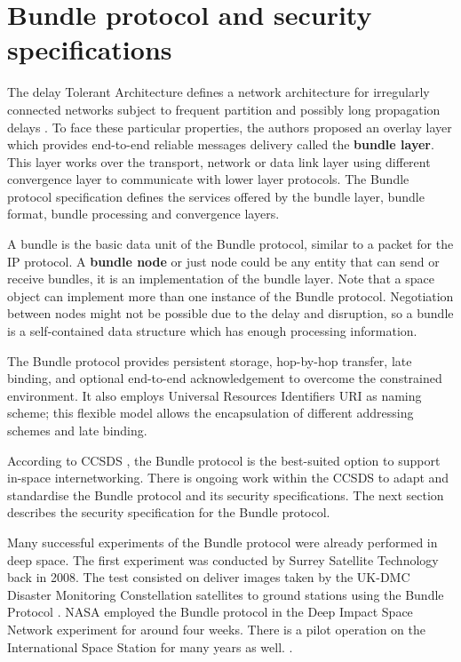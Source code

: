 \section{Bundle protocol and security specifications }
\label{sec:dtn}

The delay Tolerant Architecture defines a network architecture for irregularly connected networks subject to frequent partition and possibly long propagation delays \cite{cerf2007delay}. To face these particular properties, the authors proposed an overlay layer which provides end-to-end reliable messages delivery called the \textbf{bundle layer}. This layer works over the transport, network or data link layer using different convergence layer to communicate with lower layer protocols. The Bundle protocol specification \cite{rfc5050} defines the services offered by the bundle layer, bundle format, bundle processing and convergence layers. 

A bundle is the basic data unit of the Bundle protocol, similar to a packet for the IP protocol. A \textbf{bundle node} or just node could be any entity that can send or receive bundles, it is an implementation of the bundle layer. Note that a space object can implement more than one instance of the Bundle protocol. Negotiation between nodes might not be possible due to the delay and disruption, so a bundle is a self-contained data structure which has enough processing information.


The Bundle protocol provides persistent storage, hop-by-hop transfer, late binding, and optional end-to-end acknowledgement to overcome the constrained environment. It also employs Universal Resources Identifiers URI as naming scheme; this flexible model allows the encapsulation of different addressing schemes and late binding. 

According to CCSDS \cite{rationale2010requirements}, the Bundle protocol is the best-suited option to support in-space internetworking. There is ongoing work within the CCSDS to adapt and standardise the Bundle protocol and its security specifications. The next section describes the security specification for the Bundle protocol. 

Many successful experiments of the Bundle protocol were already performed in deep space. The first experiment was conducted by Surrey Satellite Technology back in 2008. The test consisted on deliver images taken by the UK-DMC Disaster Monitoring Constellation satellites to ground stations using the Bundle Protocol \cite{ivancic2010experience}. NASA employed the Bundle protocol in the Deep Impact Space Network experiment for around four weeks. There is a pilot operation on the International Space Station for many years as well. \cite{araniti2015contact}.    


